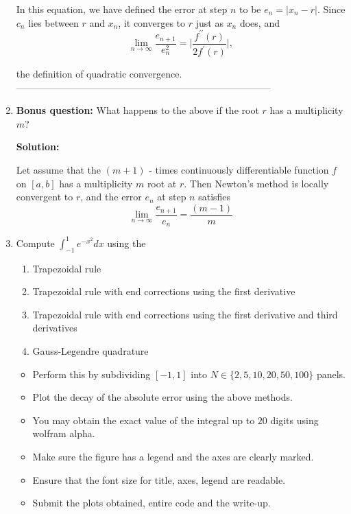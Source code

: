 \documentclass[a4paper,11pt]{report}
\begin{document}
\begin{enumerate}
    In this equation, we have defined  the error at step $n$ to be $e_{n} = |x_{n} - r|$. Since $c_{n}$ lies between $r$ and $x_{n}$, it converges to $r$ just as $x_{n}$ does, and
    \begin{equation*}
    \lim_{n \rightarrow \infty} \frac{e_{n+1}}{e_{n}^2} = \Bigg| \frac{f^{\prime\prime}(r)}{2f^{\prime}(r)} \Bigg|,
    \end{equation*}
    
    the definition of quadratic convergence.    
--------------------------------------------------------------------------------
     





    \item \textbf{Bonus question:} What happens to the above if the root $r$ has
     a multiplicity $m$?
    
    \textbf{Solution:}
    
    Let assume that the $(m+1)$ - times continuously differentiable function
    $f$ on $[a, b]$ has a multiplicity $m$ root at $r$. Then Newton's method is 
    locally convergent to $r$, and the error $e_{n}$ at step $n$ satisfies
    \begin{equation*}
    \lim_{n \rightarrow \infty} \frac{e_{n+1}}{e_{n}} = \frac{(m-1)}{m}
    \end{equation*}








    \item Compute $\displaystyle \int_{-1}^{1} e^{-x^{2}} dx$ using the

    \begin{enumerate}
    \item Trapezoidal rule
    \item Trapezoidal rule with end corrections using the first derivative
    \item Trapezoidal rule with end corrections using the first derivative and third
    derivatives
    \item Gauss-Legendre quadrature
    \end{enumerate}

    \begin{itemize}
    \item Perform this by subdividing $[-1, 1]$ into $N \in \{2, 5, 10, 20, 50, 100\}$ 
    panels.
    \item Plot the decay of the absolute error using the above methods.
    \item You may obtain the exact value of the integral up to $20$ digits using
    wolfram alpha.
    \item Make sure the figure has a legend and the axes are clearly marked.
    \item Ensure that the font size for title, axes, legend are readable.
    \item Submit the plots obtained, entire code and the write-up.
    \end{itemize}
        

\end{enumerate}
\end{document}
